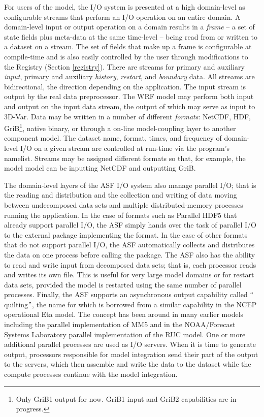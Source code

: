 For users of the model, the I/O system is presented at a high
domain-level as configurable streams that perform an I/O operation
on an entire domain. A domain-level input or output operation on a domain
results in a {\em frame} -- a set of state fields plus meta-data at the same
time-level -- being read from or written to a dataset on a stream.
The set of fields that make up a frame is configurable at compile-time
and is also easily controlled by the user through modifications to the
Registry (Section \ref{registry}).  There are streams for
primary and auxiliary {\em input}, primary and auxiliary {\em history}, {\em restart}, and
{\em boundary} data. All streams are bidirectional, the direction
depending on the application. The input stream is output by the real
data preprocessor. The WRF model may perform both input and output
on the input data stream, the output of which may serve as input to 3D-Var.
Data may be written in a number of different {\em formats}:
NetCDF, HDF, GriB\footnote{Only GriB1 output for now. GriB1 input and
GriB2 capabilities are in-progress.}, native binary, or through a
on-line model-coupling layer to another component model.  The dataset
name, format, times, and frequency of domain-level I/O on a given
stream are controlled at run-time via the program's namelist.  Streams
may be assigned different formats so that, for example, the model
model can be inputting NetCDF and outputting GriB.

The domain-level layers of the ASF I/O system also manage parallel I/O;
that is the reading and distribution and the collection and writing of
data moving between undecomposed data sets and multiple
distributed-memory processes running the application.  In the case of
formats such as Parallel HDF5 that already support parallel I/O, the
ASF simply hands over the task of parallel I/O to the external package
implementing the format. In the case of other formats that do not
support parallel I/O, the ASF automatically collects and distributes
the data on one process before calling the package. The ASF also has
the ability to read and write input from decomposed data sets; that is,
each processor reads and writes its own file. This is useful for very
large model domains or for restart data sets, provided the model is
restarted using the same number of parallel processes. Finally, the ASF
supports an asynchronous output capability called $``$quilting$"$, the name
for which is borrowed from a similar capability in the NCEP operational
Eta model. The concept has been around in many earlier models including
the parallel implementation of MM5 and in the NOAA/Forecast Systems Laboratory parallel
implementation of the RUC model. One or more additional parallel
processes are used as I/O servers. When it is time to generate output,
processors responsible for model integration send their part of the
output to the servers, which then assemble and write the data to the
dataset while the compute processes continue with the model integration.

